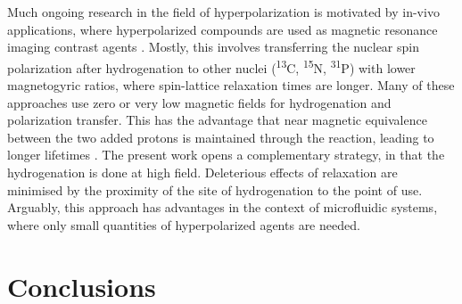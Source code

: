 Much ongoing research in the field of hyperpolarization is
motivated by in-vivo applications, where hyperpolarized compounds
are used as magnetic
resonance imaging contrast agents \cite{Hovener:2018cg}.
Mostly, this involves transferring the
nuclear spin polarization after hydrogenation to other nuclei
(\textsuperscript{13}C, \textsuperscript{15}N, \textsuperscript{31}P) with
lower magnetogyric ratios, where spin-lattice relaxation times are longer.
\cite{Goldman:2005bf,Goldman:2006cp,Reineri:2015he} Many of these approaches
use zero or very low magnetic fields for hydrogenation and polarization
transfer. This has the advantage that near magnetic equivalence between the two
added protons is maintained through the reaction, leading to longer lifetimes
\cite{bhattacharya2007towards,chekmenev2008pasadena,
chekmenev2009hyperpolarized,shchepin2014parahydrogen,
Reineri:2015he,cavallari201813,Ripka:2018dc,roy2018sabre}.
The present work opens a complementary strategy, in that the hydrogenation
is done at high field. Deleterious effects of relaxation are minimised by
the proximity of the site of hydrogenation to the point of use. Arguably,
this approach has advantages in the context of microfluidic systems, where
only small quantities of hyperpolarized agents are needed.

\section{Conclusions}

